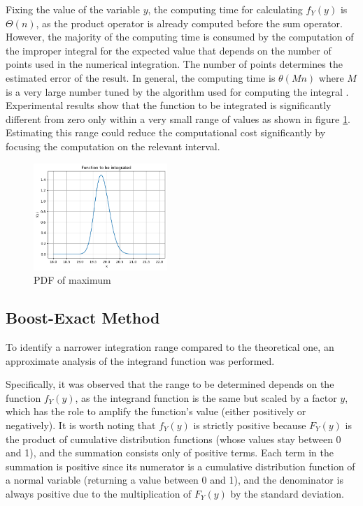Fixing the value of the variable $y$, the computing time for calculating $f_Y(y)$ is $\Theta(n)$, as the product operator is already computed before the sum operator. However, the majority of the computing time is consumed by the computation of the improper integral for the expected value that depends on the number of points used in the numerical integration. The number of points determines the estimated error of the result. In general, the computing time is $\theta(M n)$ where $M$ is a very large number tuned by the algorithm used for computing the integral \cite{2020SciPy-NMeth}.
Experimental results show that the function to be integrated is significantly different from zero only within a very small range of values as shown in figure \ref{pdf}. Estimating this range could reduce the computational cost significantly by focusing the computation on the relevant interval.

\begin{figure}[h!]
	\centering
	\includegraphics[width=0.45\textwidth]{../../code/notebooks/images/integrand.png} %
	\caption{PDF of maximum}
	\label{pdf}
\end{figure}

\subsection{Boost-Exact Method}
To identify a narrower integration range compared to the theoretical one, an approximate analysis of the integrand function was performed.

Specifically, it was observed that the range to be determined depends on the function \( f_Y(y) \), as the integrand function is the same but scaled by a factor \( y \), which has the role to amplify the function's value (either positively or negatively). It is worth noting that \( f_Y(y) \) is strictly positive because \( F_Y(y) \) is the product of cumulative distribution functions (whose values stay between 0 and 1), and the summation consists only of positive terms. Each term in the summation is positive since its numerator is a cumulative distribution function of a normal variable (returning a value between 0 and 1), and the denominator is always positive due to the multiplication of \( F_Y(y) \) by the standard deviation.

